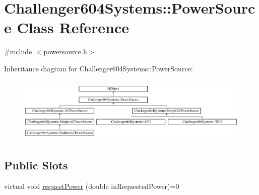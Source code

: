 \hypertarget{class_challenger604_systems_1_1_power_source}{\section{Challenger604\-Systems\-:\-:Power\-Source Class Reference}
\label{class_challenger604_systems_1_1_power_source}
}


{\ttfamily \#include $<$powersource.\-h$>$}

Inheritance diagram for Challenger604\-Systems\-:\-:Power\-Source\-:\begin{figure}[H]
\begin{center}
\leavevmode
\includegraphics[height=3.174603cm]{class_challenger604_systems_1_1_power_source}
\end{center}
\end{figure}
\subsection*{Public Slots}
\begin{DoxyCompactItemize}
\item 
virtual void \hyperlink{class_challenger604_systems_1_1_power_source_a7337c7de30e3d23c551d3a41370b34bb}{request\-Power} (double in\-Requested\-Power)=0
\end{DoxyCompactItemize}
